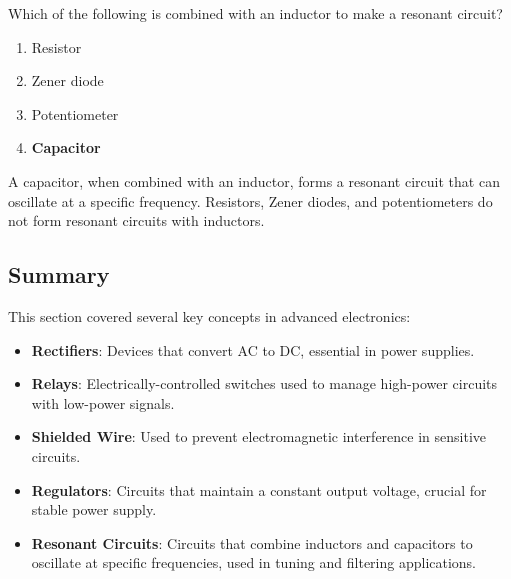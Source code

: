 
\begin{tcolorbox}[colback=gray!10!white,colframe=black!75!black,title={T6D08}]
    Which of the following is combined with an inductor to make a resonant circuit?
    \begin{enumerate}[label=\Alph*,noitemsep]
        \item Resistor
        \item Zener diode
        \item Potentiometer
        \item \textbf{Capacitor}
    \end{enumerate}
\end{tcolorbox}
A capacitor, when combined with an inductor, forms a resonant circuit that can oscillate at a specific frequency. Resistors, Zener diodes, and potentiometers do not form resonant circuits with inductors.


\subsection*{Summary}
This section covered several key concepts in advanced electronics:
\begin{itemize}
    \item \textbf{Rectifiers}: Devices that convert AC to DC, essential in power supplies.
    \item \textbf{Relays}: Electrically-controlled switches used to manage high-power circuits with low-power signals.
    \item \textbf{Shielded Wire}: Used to prevent electromagnetic interference in sensitive circuits.
    \item \textbf{Regulators}: Circuits that maintain a constant output voltage, crucial for stable power supply.
    \item \textbf{Resonant Circuits}: Circuits that combine inductors and capacitors to oscillate at specific frequencies, used in tuning and filtering applications.
\end{itemize}
